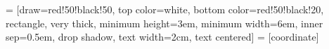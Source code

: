 %
%
%
%

\setcounter{secnumdepth}{3}
\setcounter{tocdepth}{3}

\usepackage[T1]{fontenc}
\usepackage[latin9]{inputenc}

\usepackage{babel}
\usepackage{array}
\usepackage{float}
\usepackage{graphicx}
\usepackage{nomencl}
\usepackage{fancyhdr}
\usepackage{tikz}
\usepackage{lastpage}

\pagestyle{fancy}


\fancyfoot[RE,RO]{
  \footnotesize{
    \jobname\\
    \today
  }
}

\usetikzlibrary{shapes,arrows,shadows,calc}
   = [draw=red!50!black!50, %
                       top color=white,
                       bottom color=red!50!black!20,
                       rectangle,
                       very thick,
                       minimum height=3em,
                       minimum width=6em,
                       inner sep=0.5em,
                       drop shadow,
                       text width=2cm,
                       text centered]
   = [coordinate]

 
